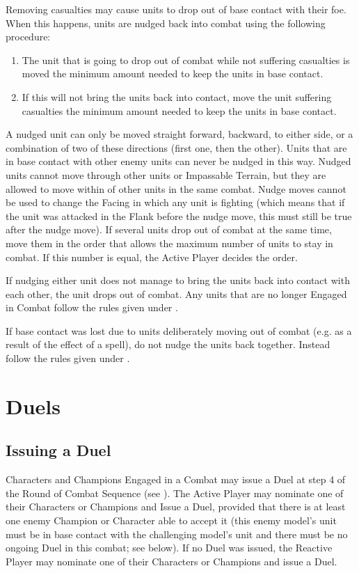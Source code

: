 Removing casualties may cause units to drop out of base contact with their foe. When this happens, units are nudged back into combat using the following procedure:
\begin{enumerate}
\item The unit that is going to drop out of combat while not suffering casualties is moved the minimum amount needed to keep the units in base contact.
\item If this will not bring the units back into contact, move the unit suffering casualties the minimum amount needed to keep the units in base contact.
\end{enumerate}
A nudged unit can only be moved straight forward, backward, to either side, or a combination of two of these directions (first one, then the other). Units that are in base contact with other enemy units can never be nudged in this way. Nudged units cannot move through other units or Impassable Terrain, but they are allowed to move within  of other units in the same combat. Nudge moves cannot be used to change the Facing in which any unit is fighting (which means that if the unit was attacked in the Flank before the nudge move, this must still be true after the nudge move). If several units drop out of combat at the same time, move them in the order that allows the maximum number of units to stay in combat. If this number is equal, the Active Player decides the order.\par

If nudging either unit does not manage to bring the units back into contact with each other, the unit drops out of combat. Any units that are no longer Engaged in Combat follow the rules given under .
\par

If base contact was lost due to units deliberately moving out of combat (e.g. as a result of the effect of a spell), do not nudge the units back together. Instead follow the rules given under .

\section{Duels}
\label{duels}

\subsection{Issuing a Duel}
\label{issuing_a_duel}

Characters and Champions Engaged in a Combat may issue a Duel at step 4 of the Round of Combat Sequence (see ). The Active Player may nominate one of their Characters or Champions and Issue a Duel, provided that there is at least one enemy Champion or Character able to accept it (this enemy model's unit must be in base contact with the challenging model's unit and there must be no ongoing Duel in this combat; see below). If no Duel was issued, the Reactive Player may nominate one of their Characters or Champions and issue a Duel.

